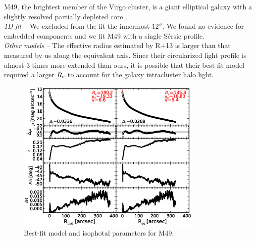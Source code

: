 \documentclass[preprint2]{emulateapj}
\newcommand{\fitfigurewidth}{0.8\textwidth}
\begin{document}
  M49, the brightest member of the Virgo cluster, is a giant elliptical galaxy 
  with a slightly resolved partially depleted core \citep{rusli2013}. \\ %

  \emph{1D fit -- }
  We excluded from the fit the innermost $12''$.
  We found no evidence for embedded components and
  we fit M49 with a single S\'ersic profile. \\
  
  \emph{Other models -- } 
  The effective radius estimated by R+13 is larger than that measured by us along the equivalent axis.
  Since their circularized light profile is almost 3 times more extended than ours, 
  it is possible that their best-fit model required a larger $R_{\rm e}$ to account for the galaxy intracluster halo light.
  

  \begin{figure}[h]
  \begin{center}
  \includegraphics[width=\fitfigurewidth]{images/m49_1Dfit.eps}
  \caption{Best-fit model and isophotal parameters for M49.}
  \end{center}
  \end{figure}
\end{document}
